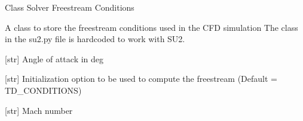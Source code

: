 \documentclass[letterpaper,10pt,english]{sphinxmanual}
\begin{document}
\begin{fulllineitems}
\label{\detokenize{modules:su2.Solver_Freestream_Conditions}}
\pysigstartsignatures
{}
\pysigstopsignatures
\sphinxAtStartPar
Class Solver Freestream Conditions

\sphinxAtStartPar
A class to store the freestream conditions used in the CFD simulation
The class in the su2.py file is hardcoded to work with SU2.

\begin{fulllineitems}
\label{\detokenize{modules:su2.Solver_Freestream_Conditions.aoa}}
\pysigstartsignatures
{}
\pysigstopsignatures
\sphinxAtStartPar
{[}str{]} Angle of attack in deg

\end{fulllineitems}


\begin{fulllineitems}
\label{\detokenize{modules:su2.Solver_Freestream_Conditions.init_option}}
\pysigstartsignatures
{}
\pysigstopsignatures
\sphinxAtStartPar
{[}str{]} Initialization option to be used to compute the freestream (Default = TD\_CONDITIONS)

\end{fulllineitems}


\begin{fulllineitems}
\label{\detokenize{modules:su2.Solver_Freestream_Conditions.mach}}
\pysigstartsignatures
{}
\pysigstopsignatures
\sphinxAtStartPar
{[}str{]} Mach number

\end{fulllineitems}



\end{fulllineitems}
\end{document}
